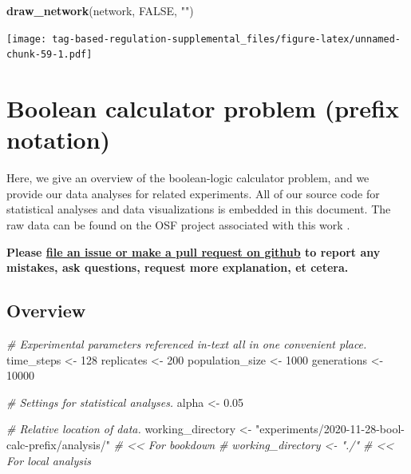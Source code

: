 \documentclass[
]{book}
\newenvironment{Shaded}{\begin{snugshade}}{\end{snugshade}}
\newcommand{\CommentTok}[1]{\textcolor[rgb]{0.56,0.35,0.01}{\textit{#1}}}
\newcommand{\DecValTok}[1]{\textcolor[rgb]{0.00,0.00,0.81}{#1}}
\newcommand{\FloatTok}[1]{\textcolor[rgb]{0.00,0.00,0.81}{#1}}
\newcommand{\KeywordTok}[1]{\textcolor[rgb]{0.13,0.29,0.53}{\textbf{#1}}}
\newcommand{\NormalTok}[1]{#1}
\newcommand{\OtherTok}[1]{\textcolor[rgb]{0.56,0.35,0.01}{#1}}
\newcommand{\StringTok}[1]{\textcolor[rgb]{0.31,0.60,0.02}{#1}}
\begin{document}
\begin{Shaded}
\begin{Highlighting}[]
\KeywordTok{draw\_network}\NormalTok{(network, }\OtherTok{FALSE}\NormalTok{, }\StringTok{""}\NormalTok{)}
\end{Highlighting}
\end{Shaded}

\texttt{[image: tag-based-regulation-supplemental\_files/figure-latex/unnamed-chunk-59-1.pdf]}

\hypertarget{boolean-calculator-problem-prefix-notation}{%
\chapter{Boolean calculator problem (prefix notation)}\label{boolean-calculator-problem-prefix-notation}}

Here, we give an overview of the boolean-logic calculator problem, and we provide our data analyses for related experiments.
All of our source code for statistical analyses and data visualizations is embedded in this document.
The raw data can be found on the OSF project associated with this work \citep{Lalejini_Moreno_Ofria_Data_2020}.

\textbf{Please \href{https://github.com/amlalejini/Tag-based-Genetic-Regulation-for-LinearGP/issues}{file an issue or make a pull request on github} to report any mistakes, ask questions, request more explanation, et cetera.}

\hypertarget{overview-2}{%
\section{Overview}\label{overview-2}}

\begin{Shaded}
\begin{Highlighting}[]
\CommentTok{\# Experimental parameters referenced in{-}text all in one convenient place.}
\NormalTok{time\_steps \textless{}{-}}\StringTok{ }\DecValTok{128}
\NormalTok{replicates \textless{}{-}}\StringTok{ }\DecValTok{200}
\NormalTok{population\_size \textless{}{-}}\StringTok{ }\DecValTok{1000}
\NormalTok{generations \textless{}{-}}\StringTok{ }\DecValTok{10000}

\CommentTok{\# Settings for statistical analyses.}
\NormalTok{alpha \textless{}{-}}\StringTok{ }\FloatTok{0.05}

\CommentTok{\# Relative location of data.}
\NormalTok{working\_directory \textless{}{-}}\StringTok{ "experiments/2020{-}11{-}28{-}bool{-}calc{-}prefix/analysis/"} \CommentTok{\# \textless{}\textless{} For bookdown}
\CommentTok{\# working\_directory \textless{}{-} "./"                                              \# \textless{}\textless{} For local analysis}
\end{Highlighting}
\end{Shaded}
\end{document}
